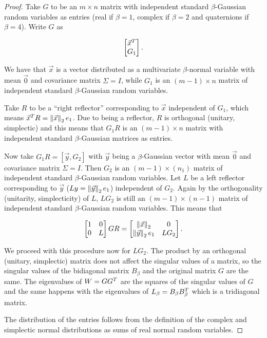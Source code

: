 \begin{proof}
    Take $G$ to be an $m\times n$ matrix with independent standard $\beta$-Gaussian random variables as entries (real if $\beta=1$, complex if $\beta=2$ and quaternions if $\beta=4$). Write $G$ as 

    \begin{equation*}
        \begin{bmatrix}
            \vec x^T\\
            G_1
        \end{bmatrix}.
    \end{equation*}

    We have that $\vec x$ is a vector distributed as a multivariate $\beta$-normal variable with mean $\vec 0$ and covariance matrix $\Sigma = I$, while $G_1$ is an $(m-1)\times n$ matrix of independent standard $\beta$-Gaussian random variables. 

    Take $R$ to be a ``right reflector'' corresponding to $\vec x$ independent of $G_1$, which means $\vec x^TR = \left\lVert\vec x\right\rVert_2 e_1$. Due to being a reflector, $R$ is orthogonal (unitary, simplectic) and this means that $G_1 R$ is an $(m-1)\times n$ matrix with independent standard $\beta$-Gaussian matrices as entries.

    Now take $G_1R = [\vec y, G_2]$ with $\vec y$ being a $\beta$-Gaussian vector with mean $\vec 0$ and covariance matrix $\Sigma = I$. Then $G_2$ is an $(m-1)\times (n_1)$ matrix of independent standard $\beta$-Gaussian random variables. Let $L$ be a left reflector corresponding to $\vec y$ ($Ly = \left\lVert\vec y\right\rVert_2 e_1$) independent of $G_2$. Again by the orthogonality (unitarity, simplecticity) of $L$, $LG_2$ is still an $(m-1)\times(n-1)$ matrix of independent standard $\beta$-Gaussian random variables. This means that

    \begin{equation*}
        \begin{bmatrix}
            1 & 0 \\
            0 & L
        \end{bmatrix} G R = \begin{bmatrix}
            \left\lVert\vec x\right\rVert_2 & 0 \\
            \left\lVert\vec y\right\rVert_2 e_1 & LG_2
        \end{bmatrix}.
    \end{equation*}

    We proceed with this procedure now for $LG_2$. The product by an orthogonal (unitary, simplectic) matrix does not affect the singular values of a matrix, so the singular values of the bidiagonal matrix $B_\beta$ and the original matrix $G$ are the same. The eigenvalues of $W = GG^T$ are the squares of the singular values of $G$ and the same happens with the eigenvalues of $L_\beta = B_\beta B_\beta^T$ which is a tridiagonal matrix.

    The distribution of the entries follows from the definition of the complex and simplectic normal distributions as sums of real normal random variables.
\end{proof}

